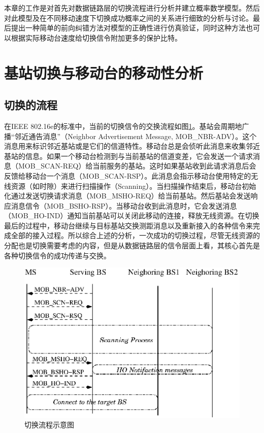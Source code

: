 本章的工作是对首先对数据链路层的切换流程进行分析并建立概率数学模型。然后对此模型及在不同移动速度下切换成功概率之间的关系进行细致的分析与讨论。最后提出一种简单的前向纠错方法对模型的正确性进行仿真验证，同时这种方法也可以根据实际移动台速度给切换信令附加更多的保护比特。

\section{基站切换与移动台的移动性分析}
\label{section_iccs_handover_algorithm_mobility_analysis}
\subsection{切换的流程}
\label{subsection_iccs_handover_algorithm_mobility_analysis_handover_flow}
在IEEE 802.16e的标准中，当前的切换信令的交换流程如图\ref{fig:chap_iccs_handover_algorithm_handover_flow}。基站会周期地广播“邻近通告消息”（Neighbor Advertisement Message, MOB\_NBR-ADV）。这个消息用来标识邻近基站或是它们的信道特性。移动台总是会侦听此消息来收集邻近基站的信息。如果一个移动台检测到与当前基站的信道变差，它会发送一个请求消息（MOB\_SCAN-REQ）给当前服务的基站。这时如果基站收到此请求消息后会反馈给移动台一个消息（MOB\_SCAN-RSP）。此消息会指示移动台使用特定的无线资源（如时隙）来进行扫描操作（Scanning）。当扫描操作结束后，移动台初始化通过发送切换请求消息（MOB\_MSHO-REQ）给当前基站。然后基站会发送响应消息信令（MOB\_BSHO-RSP）。当移动台收到此消息时，它会发送消息（MOB\_HO-IND）通知当前基站可以关闭此移动的连接，释放无线资源。在切换最后的过程中，移动台继续与目标基站交换测距消息以及重新接入的各种信令来完成全部的接入过程。所以综合上述的分析，一次成功的切换过程，尽管无线资源的分配也是切换需要考虑的内容，但是从数据链路层的信令层面上看，其核心首先是各种切换信令的成功传递与交换。
\begin{figure}[htbp]
\centering
\includegraphics[]{iccs_handover}
\caption{切换流程示意图}
\label{fig:chap_iccs_handover_algorithm_handover_flow}
\end{figure}

